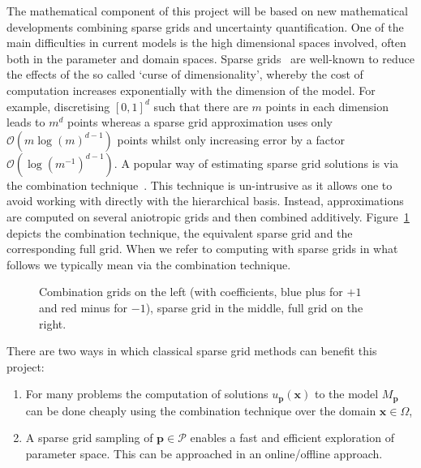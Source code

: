 \documentclass[a4paper,fontsize=12pt]{scrartcl}
\begin{document}
The mathematical component of this project will be based on new mathematical developments combining sparse grids and uncertainty quantification.
One of the main difficulties in current models is the high dimensional spaces involved, often both in the parameter and domain spaces.
Sparse grids~\parencite{BungartzGriebel2004} are well-known to reduce the effects of the so called 
`curse of dimensionality', whereby the cost of computation increases 
exponentially with the dimension of the model. 
For example, discretising $[0,1]^{d}$ such that there are $m$ points in each dimension leads to $m^{d}$ points whereas a sparse grid approximation uses only $\mathcal{O}(m\log(m)^{d-1})$ points whilst only increasing error by a factor $\mathcal{O}(\log(m^{-1})^{d-1})$.
A popular way of estimating sparse grid solutions is via the combination technique~\parencite{Griebel1990}. 
This technique is un-intrusive as it allows one to avoid working with directly with the hierarchical basis.
Instead, approximations are computed on several aniotropic grids and then combined additively.
Figure~\ref{fig:sparse_grids} depicts the combination technique, the equivalent sparse grid and the corresponding full grid.
When we refer to computing with sparse grids in what follows we typically mean via the combination technique.

\begin{figure}[h!]
\centering

\caption{Combination grids on the left (with coefficients, blue plus for $+1$ and red minus for $-1$), sparse grid in the middle, full grid on the right.}\label{fig:sparse_grids}
\end{figure}

There are two ways in which classical sparse grid methods can benefit this 
project:
\begin{enumerate}
\item For many problems the computation of solutions 
$u_{\mathbf{p}}(\mathbf{x})$ to the model $M_{\mathbf{p}}$ can be done 
cheaply using the combination technique over the domain $\mathbf{x}\in\Omega$,
\item A sparse grid sampling of $\mathbf{p}\in\mathcal{P}$ enables a fast 
and efficient exploration of parameter space. This can be approached in an online/offline approach.
\end{enumerate}
\end{document}
